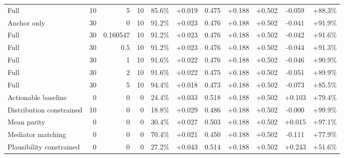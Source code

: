 \begin{table}[htbp]
\begin{tabular}{lrrrccccccc}
Full & 10 & 5 & 10 & 85.6\% & +0.019 & 0.475 & +0.188 & +0.502 & -0.059 & +88.3\% \\
Anchor only & 30 & 0 & 10 & 91.2\% & +0.023 & 0.476 & +0.188 & +0.502 & -0.041 & +91.9\% \\
Full & 30 & 0.160547 & 10 & 91.2\% & +0.023 & 0.476 & +0.188 & +0.502 & -0.042 & +91.6\% \\
Full & 30 & 0.5 & 10 & 91.2\% & +0.023 & 0.476 & +0.188 & +0.502 & -0.044 & +91.3\% \\
Full & 30 & 1 & 10 & 91.6\% & +0.022 & 0.476 & +0.188 & +0.502 & -0.046 & +90.9\% \\
Full & 30 & 2 & 10 & 91.6\% & +0.022 & 0.475 & +0.188 & +0.502 & -0.051 & +89.9\% \\
Full & 30 & 5 & 10 & 94.4\% & +0.018 & 0.473 & +0.188 & +0.502 & -0.073 & +85.5\% \\
Actionable baseline & 0 & 0 & 0 & 24.4\% & +0.033 & 0.518 & +0.188 & +0.502 & +0.103 & +79.4\% \\
Distribution constrained & 10 & 0 & 0 & 18.8\% & +0.029 & 0.486 & +0.188 & +0.502 & -0.000 & +99.9\% \\
Mean parity & 0 & 0 & 0 & 30.4\% & +0.027 & 0.503 & +0.188 & +0.502 & +0.015 & +97.1\% \\
Mediator matching & 0 & 0 & 0 & 70.4\% & +0.021 & 0.450 & +0.188 & +0.502 & -0.111 & +77.9\% \\
Plausibility constrained & 0 & 0 & 0 & 27.2\% & +0.043 & 0.514 & +0.188 & +0.502 & +0.243 & +51.6\% \\
\bottomrule
\end{tabular}
\end{table}
